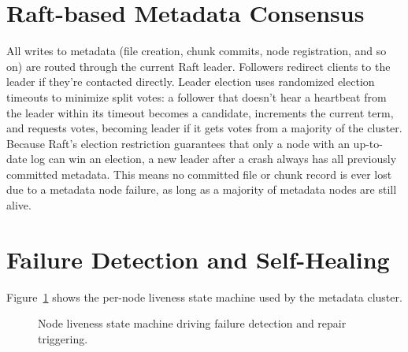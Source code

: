 \documentclass[12pt,a4paper]{report}
\begin{document}
\section{Raft-based Metadata Consensus}

All writes to metadata (file creation, chunk commits, node registration, and so on) are routed through the current Raft leader. Followers redirect clients to the leader if they're contacted directly. Leader election uses randomized election timeouts to minimize split votes: a follower that doesn't hear a heartbeat from the leader within its timeout becomes a candidate, increments the current term, and requests votes, becoming leader if it gets votes from a majority of the cluster. Because Raft's election restriction guarantees that only a node with an up-to-date log can win an election, a new leader after a crash always has all previously committed metadata. This means no committed file or chunk record is ever lost due to a metadata node failure, as long as a majority of metadata nodes are still alive.

\section{Failure Detection and Self-Healing}

Figure~\ref{fig:failstates} shows the per-node liveness state machine used by the metadata cluster.

\begin{figure}[h]
\centering
{}
\caption{Node liveness state machine driving failure detection and repair triggering.}
\label{fig:failstates}
\end{figure}
\end{document}
